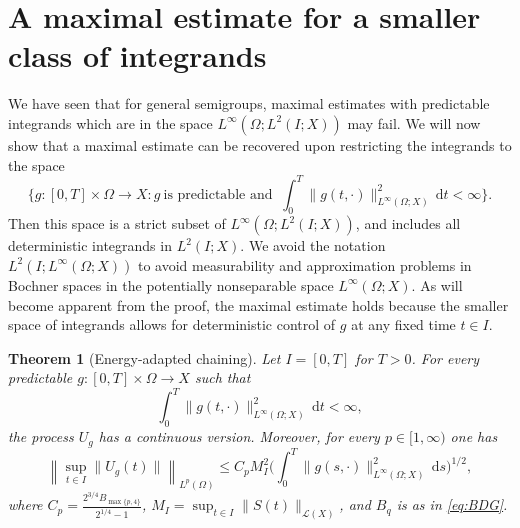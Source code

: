 \documentclass[11pt]{amsart}
\newtheorem{theorem}{Theorem}[section]
\theoremstyle{definition}
\theoremstyle{remark}
\numberwithin{equation}{section}
\newcommand{\1}{\mathbf 1}
\newcommand{\norm}[1]{\lVert #1\rVert}
\newcommand{\dd}{\,\mathrm d}
\begin{document}
\section{A maximal estimate for a smaller class of integrands}
\label{sec:special-processes}
We have seen that for general semigroups, maximal estimates with predictable integrands which are in the space $L^\infty(\Omega;L^2(I;X))$ may fail.
We will now show that a maximal estimate can be recovered upon restricting the integrands to the space 
\[
\{g:[0,T]\times \Omega\to X: g \ \text{is predictable and } \ \int_0^T \|g(t,\cdot)\|_{L^\infty(\Omega;X)}^2 \dd t<\infty\}.\]
Then this space is a strict subset of \(L^\infty(\Omega;L^2(I;X))\), and includes all deterministic integrands in $L^2(I;X)$.
We avoid the notation \(L^2(I;L^\infty(\Omega;X))\) to avoid measurability and approximation problems in Bochner spaces in the potentially nonseparable space $L^\infty(\Omega;X)$. 
As will become apparent from the proof, the maximal estimate holds because the smaller space of integrands allows for deterministic control of $g$ at any fixed time $t \in I$.

\begin{theorem}[Energy-adapted chaining]
\label{thm:chaining}
Let $I = [0,T]$ for $T > 0$.
For every predictable $g:[0,T]\times \Omega\to X$ such that
\[\int_0^T \|g(t,\cdot)\|_{L^\infty(\Omega;X)}^2 \dd t<\infty,\]
the process $U_g$ has a continuous version.
Moreover, for every $p \in [1,\infty)$ one has
\begin{equation}
 \left\|
  \sup_{t \in I}\norm{U_g(t)}
 \right\|_{L^p(\Omega)}
 \leq C_p M_I^2 \Big(\int_0^T \|g(s,\cdot)\|_{L^\infty(\Omega;X)}^2 \dd s\Big)^{1/2},
 \label{eq:chaining-estimate}
\end{equation}
where $C_p = \frac{2^{3/4}B_{\max\{p,4\}}} {2^{1/4} - 1}$, $M_I = \sup_{t \in I}\norm{S(t)}_{\mathscr{L}(X)}$, and $B_q$ is as in \eqref{eq:BDG}. 
\end{theorem}
\end{document}
